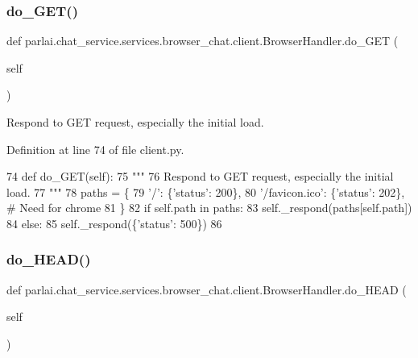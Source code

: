 \subsubsection{\texorpdfstring{do\+\_\+\+G\+E\+T()}{do\_GET()}}
{\footnotesize\ttfamily def parlai.\+chat\+\_\+service.\+services.\+browser\+\_\+chat.\+client.\+Browser\+Handler.\+do\+\_\+\+G\+ET (\begin{DoxyParamCaption}\item[{}]{self }\end{DoxyParamCaption})}

\begin{DoxyVerb}Respond to GET request, especially the initial load.
\end{DoxyVerb}
 

Definition at line 74 of file client.\+py.


\begin{DoxyCode}
74     \textcolor{keyword}{def }do\_GET(self):
75         \textcolor{stringliteral}{"""}
76 \textcolor{stringliteral}{        Respond to GET request, especially the initial load.}
77 \textcolor{stringliteral}{        """}
78         paths = \{
79             \textcolor{stringliteral}{'/'}: \{\textcolor{stringliteral}{'status'}: 200\},
80             \textcolor{stringliteral}{'/favicon.ico'}: \{\textcolor{stringliteral}{'status'}: 202\},  \textcolor{comment}{# Need for chrome}
81         \}
82         \textcolor{keywordflow}{if} self.path \textcolor{keywordflow}{in} paths:
83             self.\_respond(paths[self.path])
84         \textcolor{keywordflow}{else}:
85             self.\_respond(\{\textcolor{stringliteral}{'status'}: 500\})
86 
\end{DoxyCode}
\mbox{\label{classparlai_1_1chat__service_1_1services_1_1browser__chat_1_1client_1_1BrowserHandler_a8364ce2f5f1ff8e26a1b4c27a1393281}} 
\subsubsection{\texorpdfstring{do\+\_\+\+H\+E\+A\+D()}{do\_HEAD()}}
{\footnotesize\ttfamily def parlai.\+chat\+\_\+service.\+services.\+browser\+\_\+chat.\+client.\+Browser\+Handler.\+do\+\_\+\+H\+E\+AD (\begin{DoxyParamCaption}\item[{}]{self }\end{DoxyParamCaption})}

